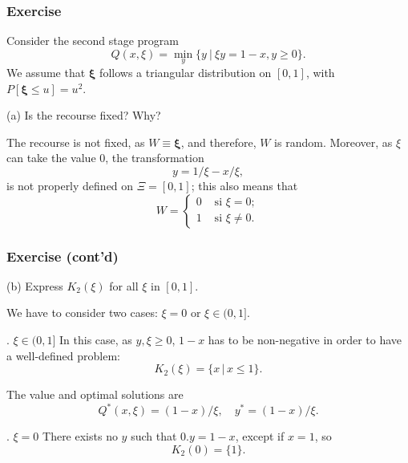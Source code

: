 \documentclass{beamer}
\def\bxi{\boldsymbol\xi}
\def\bxi{\boldsymbol\xi}
\begin{document}
\begin{frame}
\frametitle{Exercise}
	
Consider the second stage program
\[
Q(x, \xi) = \min_y \lbrace y \ |\ \xi y = 1-x, y \geq 0 \rbrace.
\]
We assume that $\bxi$ follows a triangular distribution on $[0,1]$, with $P[\bxi \leq u] = u^2$.
	
\mbox{}
	
{\blue (a)}
Is the recourse fixed? Why?
	
\mbox{}
	
The recourse is not fixed, as $W \equiv \bxi$, and therefore, $W$ is random.
Moreover, as $\xi$ can take the value 0, the transformation
\[
y = 1/\xi - x/\xi,
\]
is not properly defined on $\Xi = [0,1]$; this also means that
\[
W =
\begin{cases}
0 & \mbox{ si } \xi = 0; \\
1 & \mbox{ si } \xi \ne 0.
\end{cases}
\]
	
\end{frame}

\begin{frame}
\frametitle{Exercise (cont'd)}
	
{\blue (b)} Express $K_2(\xi)$ for all $\xi$ in $[0,1]$.
	
\mbox{}
	
We have to consider two cases: $\xi = 0$ or $\xi \in (0,1]$.
	
\mbox{}
	
{. $\xi \in (0,1]$} In this case, as $y, \xi \geq 0$, $1-x$ has to be non-negative in order to have a well-defined problem:
\[
K_2(\xi) = \lbrace x\,|\, x \leq 1 \rbrace.
\]

The value and optimal solutions are
\[
Q^*(x,\xi) = (1-x)/\xi,\quad y^*= (1-x)/\xi.
\]
	
{. $\xi=0$} There exists no $y$ such that $0.y = 1-x$, except if $x = 1$, so
\[
K_2(0) = \lbrace 1 \rbrace.
\]
	
\end{frame}
\end{document}
